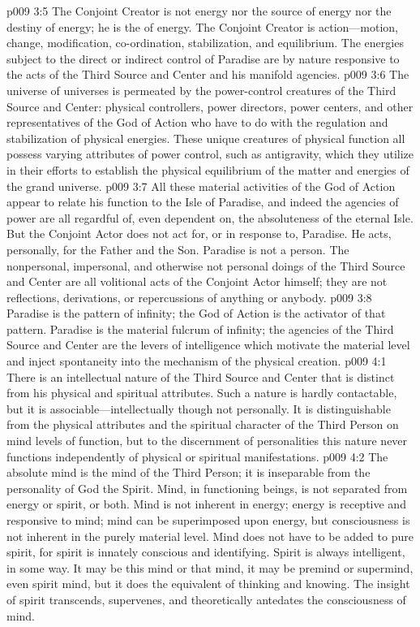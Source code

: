 \pc \vs p009 3:5 The Conjoint Creator is not energy nor the source of energy nor the destiny of energy; he is the  of energy. The Conjoint Creator is action---motion, change, modification, co\hyp{}ordination, stabilization, and equilibrium. The energies subject to the direct or indirect control of Paradise are by nature responsive to the acts of the Third Source and Center and his manifold agencies.
\vs p009 3:6 The universe of universes is permeated by the power\hyp{}control creatures of the Third Source and Center: physical controllers, power directors, power centers, and other representatives of the God of Action who have to do with the regulation and stabilization of physical energies. These unique creatures of physical function all possess varying attributes of power control, such as antigravity, which they utilize in their efforts to establish the physical equilibrium of the matter and energies of the grand universe.\plusone
\vs p009 3:7 All these material activities of the God of Action appear to relate his function to the Isle of Paradise, and indeed the agencies of power are all regardful of, even dependent on, the absoluteness of the eternal Isle. But the Conjoint Actor does not act for, or in response to, Paradise. He acts, personally, for the Father and the Son. Paradise is not a person. The nonpersonal, impersonal, and otherwise not personal doings of the Third Source and Center are all volitional acts of the Conjoint Actor himself; they are not reflections, derivations, or repercussions of anything or anybody.
\vs p009 3:8 Paradise is the pattern of infinity; the God of Action is the activator of that pattern. Paradise is the material fulcrum of infinity; the agencies of the Third Source and Center are the levers of intelligence which motivate the material level and inject spontaneity into the mechanism of the physical creation.
\vs p009 4:1 There is an intellectual nature of the Third Source and Center that is distinct from his physical and spiritual attributes. Such a nature is hardly contactable, but it is associable---intellectually though not personally. It is distinguishable from the physical attributes and the spiritual character of the Third Person on mind levels of function, but to the discernment of personalities this nature never functions independently of physical or spiritual manifestations.
\vs p009 4:2 The absolute mind is the mind of the Third Person; it is inseparable from the personality of God the Spirit. Mind, in functioning beings, is not separated from energy or spirit, or both. Mind is not inherent in energy; energy is receptive and responsive to mind; mind can be superimposed upon energy, but consciousness is not inherent in the purely material level. Mind does not have to be added to pure spirit, for spirit is innately conscious and identifying. Spirit is always intelligent,  in some way. It may be this mind or that mind, it may be premind or supermind, even spirit mind, but it does the equivalent of thinking and knowing. The insight of spirit transcends, supervenes, and theoretically antedates the consciousness of mind.
